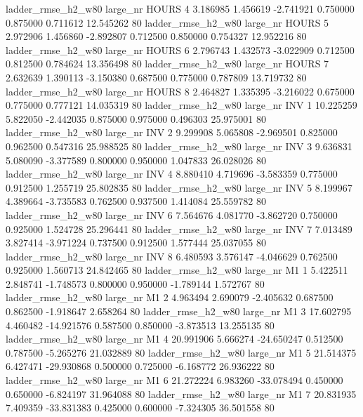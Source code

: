  ladder_rmse_h2_w80   large_nr    HOURS                 4  3.186985  1.456619  -2.741921 0.750000 0.875000  0.711612   12.545262 80
 ladder_rmse_h2_w80   large_nr    HOURS                 5  2.972906  1.456860  -2.892807 0.712500 0.850000  0.754327   12.952216 80
 ladder_rmse_h2_w80   large_nr    HOURS                 6  2.796743  1.432573  -3.022909 0.712500 0.812500  0.784624   13.356498 80
 ladder_rmse_h2_w80   large_nr    HOURS                 7  2.632639  1.390113  -3.150380 0.687500 0.775000  0.787809   13.719732 80
 ladder_rmse_h2_w80   large_nr    HOURS                 8  2.464827  1.335395  -3.216022 0.675000 0.775000  0.777121   14.035319 80
 ladder_rmse_h2_w80   large_nr      INV                 1 10.225259  5.822050  -2.442035 0.875000 0.975000  0.496303   25.975001 80
 ladder_rmse_h2_w80   large_nr      INV                 2  9.299908  5.065808  -2.969501 0.825000 0.962500  0.547316   25.988525 80
 ladder_rmse_h2_w80   large_nr      INV                 3  9.636831  5.080090  -3.377589 0.800000 0.950000  1.047833   26.028026 80
 ladder_rmse_h2_w80   large_nr      INV                 4  8.880410  4.719696  -3.583359 0.775000 0.912500  1.255719   25.802835 80
 ladder_rmse_h2_w80   large_nr      INV                 5  8.199967  4.389664  -3.735583 0.762500 0.937500  1.414084   25.559782 80
 ladder_rmse_h2_w80   large_nr      INV                 6  7.564676  4.081770  -3.862720 0.750000 0.925000  1.524728   25.296441 80
 ladder_rmse_h2_w80   large_nr      INV                 7  7.013489  3.827414  -3.971224 0.737500 0.912500  1.577444   25.037055 80
 ladder_rmse_h2_w80   large_nr      INV                 8  6.480593  3.576147  -4.046629 0.762500 0.925000  1.560713   24.842465 80
 ladder_rmse_h2_w80   large_nr       M1                 1  5.422511  2.848741  -1.748573 0.800000 0.950000 -1.789144    1.572767 80
 ladder_rmse_h2_w80   large_nr       M1                 2  4.963494  2.690079  -2.405632 0.687500 0.862500 -1.918647    2.658264 80
 ladder_rmse_h2_w80   large_nr       M1                 3 17.602795  4.460482 -14.921576 0.587500 0.850000 -3.873513   13.255135 80
 ladder_rmse_h2_w80   large_nr       M1                 4 20.991906  5.666274 -24.650247 0.512500 0.787500 -5.265276   21.032889 80
 ladder_rmse_h2_w80   large_nr       M1                 5 21.514375  6.427471 -29.930868 0.500000 0.725000 -6.168772   26.936222 80
 ladder_rmse_h2_w80   large_nr       M1                 6 21.272224  6.983260 -33.078494 0.450000 0.650000 -6.824197   31.964088 80
 ladder_rmse_h2_w80   large_nr       M1                 7 20.831935  7.409359 -33.831383 0.425000 0.600000 -7.324305   36.501558 80
